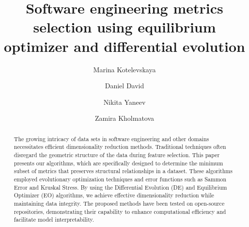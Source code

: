 \documentclass{styles/svproc}
\begin{document}
\mainmatter              %
%
\title{Software engineering metrics selection using equilibrium optimizer and differential evolution}
%
%
\author{Marina Kotelevskaya \and Daniel David
\and Nikita Yaneev \and Zamira Kholmatova}
%
%
%

\maketitle              %

\begin{abstract}
The growing intricacy of data sets in software engineering and other domains necessitates efficient dimensionality reduction methods. Traditional techniques often disregard the geometric structure of the data during feature selection. This paper presents our algorithms, which are specifically designed to determine the minimum subset of metrics that preserves structural relationships in a dataset. These algorithms employed evolutionary optimization techniques and error functions such as Sammon Error and Kruskal Stress. By using the Differential Evolution (DE) and Equilibrium Optimizer (EO) algorithms, we achieve effective dimensionality reduction while maintaining data integrity. The proposed methods have been tested on open-source repositories, demonstrating their capability to enhance computational efficiency and facilitate model interpretability. 
\end{abstract}
%
\end{document}
